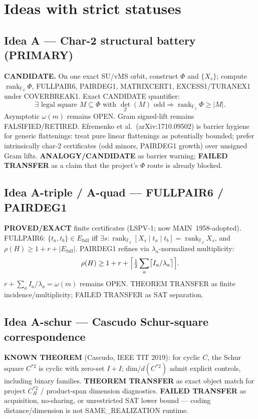 \documentclass[11pt]{article}
\begin{document}
\section*{Ideas with strict statuses}
\subsection*{Idea A --- Char-2 structural battery (PRIMARY)}
\textbf{CANDIDATE.} On one exact SU/vMS orbit, construct $\Phi$ and $\{X_s\}$;
compute $\operatorname{rank}_{\mathbb F_2}\Phi$, FULLPAIR6, PAIRDEG1, MATRIXCERT1,
EXCESS1/TURANEX1 under COVERBREAK1. Exact CANDIDATE quantifier:
\[
\exists\text{ legal square }M\subseteq\Phi\text{ with }\det_{\mathbb Z}(M)\text{ odd}
\Rightarrow\operatorname{rank}_{\mathbb F_2}\Phi\ge|M|.
\]
Asymptotic $\omega(m)$ remains OPEN. Gram signed-lift remains FALSIFIED/RETIRED.
Efremenko et al.\ (arXiv:1710.09502) is barrier hygiene for generic flattenings:
treat pure linear flattenings as potentially bounded; prefer intrinsically
char-$2$ certificates (odd minors, PAIRDEG1 growth) over unsigned Gram lifts.
\textbf{ANALOGY/CANDIDATE} as barrier warning; \textbf{FAILED TRANSFER} as a claim
that the project's $\Phi$ route is already blocked.

\subsection*{Idea A-triple / A-quad --- FULLPAIR6 / PAIRDEG1}
\textbf{PROVED/EXACT} finite certificates (LSPV-1; now MAIN~1958-adopted).
FULLPAIR6: $\{t_a,t_b\}\in E_{\mathrm{full}}$ iff $\exists s:
\operatorname{rank}_{\mathbb F_2}[X_s\mid t_a\mid t_b]=\operatorname{rank}_{\mathbb F_2}X_s$,
and $\rho(H)\ge 1+r+|E_{\mathrm{full}}|$. PAIRDEG1 refines via
$\lambda_a$-normalized multiplicity:
\[
\rho(H)\ge 1+r+\Bigl\lceil\tfrac12\sum_a\bigl\lceil I_a/\lambda_a\bigr\rceil\Bigr\rceil.
\]
$r+\sum_a I_a/\lambda_a=\omega(m)$ remains OPEN. THEOREM TRANSFER as finite
incidence/multiplicity; FAILED TRANSFER as SAT separation.

\subsection*{Idea A-schur --- Cascudo Schur-square correspondence}
\textbf{KNOWN THEOREM} (Cascudo, IEEE TIT 2019): for cyclic $C$, the Schur square
$C^{*2}$ is cyclic with zero-set $I+I$; dim$/d(C^{*2})$ admit explicit controls,
including binary families. \textbf{THEOREM TRANSFER} as exact object match for
project $C_H^{*2}$ / product-span dimension diagnostics.
\textbf{FAILED TRANSFER} as acquisition, no-sharing, or unrestricted SAT lower
bound --- coding distance/dimension is not SAME\_REALIZATION runtime.
\end{document}

